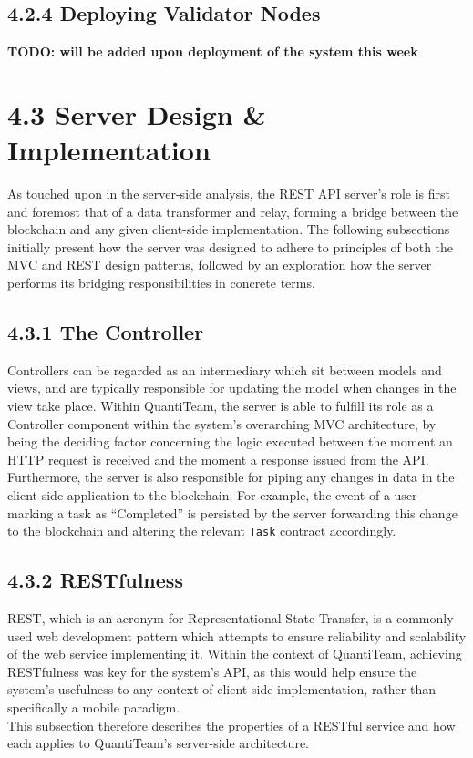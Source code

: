 \documentclass[12pt]{report}
\begin{document}
\subsection{4.2.4 Deploying Validator
Nodes}\label{deploying-validator-nodes}

\textbf{TODO: will be added upon deployment of the system this week}

\section{4.3 Server Design \&
Implementation}\label{server-design-implementation}

As touched upon in the server-side analysis, the REST API server's role
is first and foremost that of a data transformer and relay, forming a
bridge between the blockchain and any given client-side implementation.
The following subsections initially present how the server was designed
to adhere to principles of both the MVC and REST design patterns,
followed by an exploration how the server performs its bridging
responsibilities in concrete terms.

\subsection{4.3.1 The Controller}\label{the-controller}

Controllers can be regarded as an intermediary which sit between models
and views, and are typically responsible for updating the model when
changes in the view take
place\cite{osmani2012learning}. Within QuantiTeam, the server is able to fulfill
its role as a Controller component within the system's overarching MVC
architecture, by being the deciding factor concerning the logic executed
between the moment an HTTP request is received and the moment a response
issued from the API. Furthermore, the server is also responsible for
piping any changes in data in the client-side application to the
blockchain. For example, the event of a user marking a task as
``Completed'' is persisted by the server forwarding this change to the
blockchain and altering the relevant \texttt{Task} contract accordingly.

\subsection{4.3.2 RESTfulness}\label{restfulness}

REST, which is an acronym for Representational State Transfer, is a
commonly used web development pattern which attempts to ensure
reliability and scalability of the web service implementing
it\cite{1rest}. Within
the context of QuantiTeam, achieving RESTfulness was key for the
system's API, as this would help ensure the system's usefulness to any
context of client-side implementation, rather than specifically a mobile
paradigm.\\
This subsection therefore describes the properties of a RESTful service
and how each applies to QuantiTeam's server-side architecture.
\end{document}
